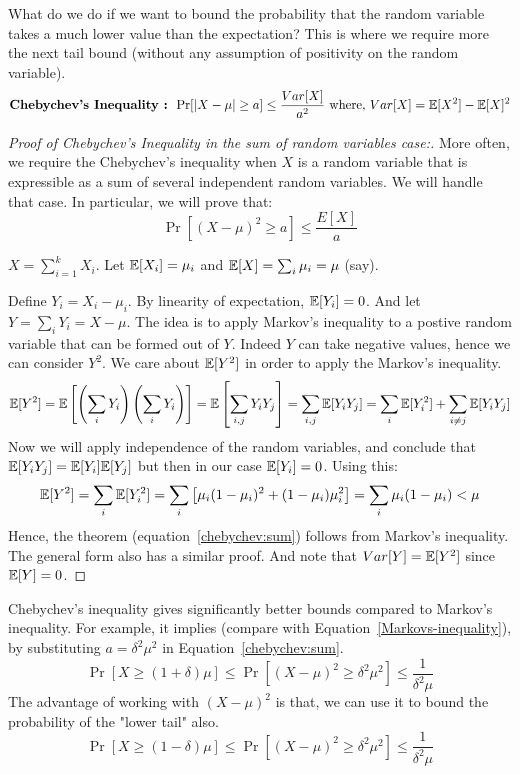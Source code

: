 \begin{description}
What do we do if we want to bound the probability that the random variable takes a much lower value than the expectation? This is where we require more the next tail bound (without any assumption of positivity on the random variable).
$$\textrm{\bf Chebychev's Inequality : } \Pr[|X-\mu| \ge a] \le \frac{Var[X]}{a^2} \textrm{ where, $Var[X] = {\mathbb E}[X^2] - {\mathbb E}[X]^2$} $$
\begin{proof}[\textit{Proof of Chebychev's Inequality in the sum of random variables case:}]
More often, we require the Chebychev's inequality when $X$ is a random variable that is expressible as a sum of several independent random variables. We will handle that case. In particular, we will prove that:
\begin{equation}
\Pr\left[ (X-\mu)^2 \ge a \right] \le \frac{E[X]}{a}
\label{chebychev:sum}
\end{equation}

$X = \sum_{i=1}^k X_i$. Let ${\mathbb E}[X_i] = \mu_i$ and ${\mathbb E}[X] = \sum_i \mu_i = \mu$ (say). 

Define $Y_i = X_i - \mu_i$. By linearity of expectation, ${\mathbb E}[Y_i] = 0$. And let $Y = \sum_i Y_i = X - \mu$. The idea is to apply Markov's inequality to a postive random variable that can be formed out of $Y$. Indeed $Y$ can take negative values, hence we can consider $Y^2$. We care about ${\mathbb E}[Y^2]$ in order to apply the Markov's inequality. 
$${\mathbb E}[Y^2] = {\mathbb E}\left[\left( \sum_i Y_i \right) \left( \sum_i Y_i \right)\right] =  {\mathbb E} \left[\sum_{i,j} Y_i Y_j \right] = \sum_{i,j} {\mathbb E}[Y_iY_j] = \sum_i {\mathbb E}[Y_i^2] + \sum_{i \neq j} {\mathbb E}[Y_iY_j] $$
Now we will apply independence of the random variables, and conclude that ${\mathbb E}[Y_iY_j] = {\mathbb E}[Y_i]{\mathbb E}[Y_j]$ but then in our case ${\mathbb E}[Y_i]=0$. Using this:
$${\mathbb E}[Y^2] = \sum_i {\mathbb E}[Y_i^2] = \sum_i \left[ \mu_i(1-\mu_i)^2 + (1-\mu_i)\mu_i^2 \right] = \sum_i \mu_i(1-\mu_i) < \mu$$
Hence, the theorem (equation~\ref{chebychev:sum}) follows from Markov's inequality.
The general form also has a similar proof. And note that $Var[Y] = {\mathbb E}[Y^2]$ since ${\mathbb E}[Y] = 0$.
\end{proof}

Chebychev's inequality gives significantly better bounds compared to Markov's inequality. For example, it implies (compare with Equation~\ref{Markovs-inequality}), by substituting $a = \delta^2 \mu^2$ in Equation~\ref{chebychev:sum}.
\begin{equation}
\Pr[X \ge (1 + \delta)\mu] \le \Pr[(X-\mu)^2 \ge \delta^2\mu^2] \le \frac{1}{\delta^2 \mu}
\label{Chebychev-inequality}
\end{equation}
The advantage of working with $(X - \mu)^2$ is that, we can use it to bound the probability of the "lower tail" also.
\begin{equation}
\Pr[X \ge (1 - \delta)\mu] \le \Pr[(X-\mu)^2 \ge \delta^2\mu^2] \le \frac{1}{\delta^2 \mu}
\label{Chebychev-inequality-lowertale}
\end{equation}



\end{description}
